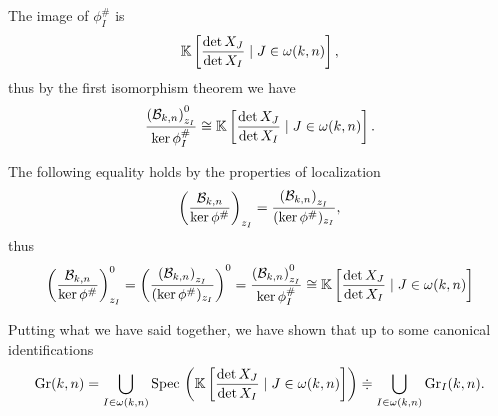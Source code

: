 \begin{remark}
The image of $\phi^\#_I$ is 
\[\mathbb{K}\left[{\frac{\det X_J}{\det X_I}\mid J\in \omega(k,n)}\right],\]
thus by the first isomorphism theorem we have
\[\frac{\left({\mathcal{B}_{k,n}}\right)_{z_I}^0}{\ker \phi^\#_I}\cong \mathbb{K}\left[{\frac{\det X_J}{\det X_I}\mid J\in \omega(k,n)}\right].\]
\end{remark}

\begin{remark}
The following equality holds by the properties of localization
\[\left({\frac{\mathcal{B}_{k,n}}{\ker\phi^\#}}\right)_{z_I}=\frac{\left({\mathcal{B}_{k,n}}\right)_{z_I}}{(\ker\phi^\#)_{z_I}},\]
thus
\[\left({\frac{\mathcal{B}_{k,n}}{\ker\phi^\#}}\right)_{z_I}^0=\left({\frac{\left({\mathcal{B}_{k,n}}\right)_{z_I}}{(\ker\phi^\#)_{z_I}}}\right)^0=\frac{\left({\mathcal{B}_{k,n}}\right)_{z_I}^0}{\ker \phi^\#_I}\cong \mathbb{K}\left[{\frac{\det X_J}{\det X_I}\mid J\in \omega(k,n)}\right]\]
\end{remark}

\noindent Putting what we have said together, we have shown that up to some canonical identifications
\[\mathrm{Gr}(k,n)=\bigcup_{I\in \omega(k,n)}\mathrm{Spec}\,\left({\mathbb{K}\left[{\frac{\det X_J}{\det X_I}\mid J\in \omega(k,n)}\right]}\right)\doteqdot \bigcup_{I\in \omega(k,n)}\mathrm{Gr}_I(k,n).\]

